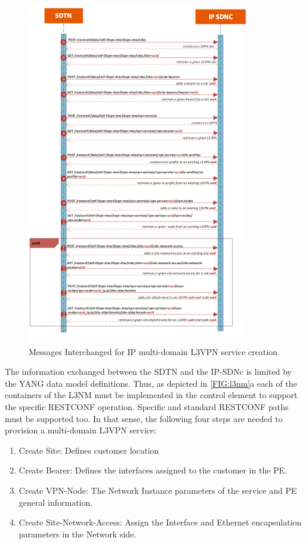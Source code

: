 \documentclass[a4paper,fleqn]{cas-dc}
\begin{document}
\begin{figure}
	\centering
		\includegraphics[width=\linewidth]{figs/l3vpn_workflow.png}
	\caption{Messages Interchanged for IP multi-domain L3VPN service creation.}
	\label{FIG:l3vpn_workflow}
\end{figure}

The information exchanged between the SDTN and the IP-SDNc is limited by the YANG data model definitions. Thus, as depicted in \cref{FIG:l3nm}a each of the containers of the L3NM must be implemented in the control element to support the specific RESTCONF operation. Specific and standard RESTCONF paths must be supported too. In that sense, the following four steps are needed to provision a multi-domain L3VPN service:
\begin{enumerate}
    \item Create Site: Defines customer location
    \item Create Bearer: Defines the interfaces assigned to the customer in the PE.
    \item Create VPN-Node: The Network Instance parameters of the service and PE general information.  
    \item Create Site-Network-Access: Assign the Interface and Ethernet encapsulation parameters in the Network side. 
\end{enumerate}
\end{document}
